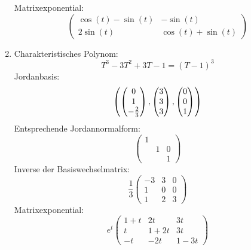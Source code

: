 \documentclass[a4paper, 10pt]{scrartcl}
\begin{document}
\begin{solution}
\begin{enumerate}[leftmargin=*]
      Matrixexponential:
      \[
        \begin{pmatrix}
          \cos(t) - \sin(t) & -\sin(t)            \\
          2 \sin(t)         &  \cos(t) + \sin(t)
        \end{pmatrix}
      \]
    \item
      Charakteristisches Polynom:
      \[
        T^3 - 3 T^2 + 3 T - 1 = (T - 1)^3
      \]
      Jordanbasis:
      \[
        \left( \begin{pmatrix} 0 \\ 1 \\ -\frac{2}{3} \end{pmatrix}, \begin{pmatrix} 3 \\ 3 \\ 3 \end{pmatrix}, \begin{pmatrix} 0 \\ 0 \\ 1 \end{pmatrix} \right)
      \]
      Entsprechende Jordannormalform:
      \[
        \begin{pmatrix}
          1 &   &   \\
            & 1 & 0 \\
            &   & 1
        \end{pmatrix}
      \]
      Inverse der Basiswechselmatrix:
      \[
        \frac{1}{3}
        \begin{pmatrix}
          -3  & 3 & 0 \\
           1  & 0 & 0 \\
           1  & 2 & 3
        \end{pmatrix}
      \]
      Matrixexponential:
      \[
        e^t
        \begin{pmatrix}
          1 + t &     2t  &     3t  \\
              t & 1 + 2t  &     3t  \\
             -t &    -2t  & 1 - 3t
        \end{pmatrix}
      \]
  \end{enumerate}
\end{solution}


\end{document}
